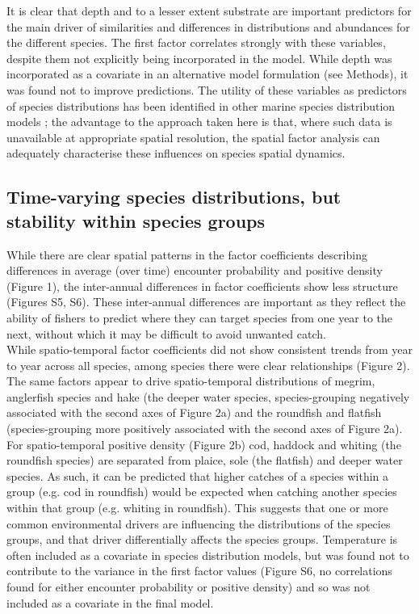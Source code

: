 \documentclass[fleqn,10pt]{wlscirep}
\begin{document}
\begin{linenumbers}
It is clear that depth and to a lesser extent substrate are important
predictors for the main driver of similarities and differences in distributions
and abundances for the different species. The first factor correlates
strongly with these variables, despite them not explicitly being incorporated
in the model. While depth was incorporated as a covariate in an alternative
model formulation (see Methods), it was found not to improve predictions. The
utility of these variables as predictors of species distributions has been
identified in other marine species distribution models \cite{Robinson2011}; the
advantage to the approach taken here is that, where such data is unavailable at
appropriate spatial resolution, the spatial factor analysis can adequately
characterise these influences on species spatial dynamics.\\

\subsection*{Time-varying species distributions, but stability within
		species groups\\} While there are clear spatial
patterns in the factor coefficients describing differences in average (over
time) encounter probability and positive density (Figure 1), the inter-annual
differences in factor coefficients show less structure (Figures S5, S6). These
inter-annual differences are important as they reflect the ability of fishers
to predict where they can target species from one year to the next, without
which it may be difficult to avoid unwanted catch.\\

While spatio-temporal factor coefficients did not show consistent trends from
year to year across all species, among species there were clear
relationships (Figure 2).  The same factors appear to drive spatio-temporal
distributions of megrim, anglerfish species and hake (the deeper water species,
species-grouping negatively associated with the second axes of Figure 2a) and
the roundfish and flatfish (species-grouping more positively associated with
the second axes of Figure 2a). For spatio-temporal positive density (Figure 2b)
cod, haddock and whiting (the roundfish species) are separated from plaice,
sole (the flatfish) and deeper water species. As such, it can be predicted that
higher catches of a species within a group (e.g. cod in roundfish) would be
expected when catching another species within that group (e.g. whiting in
roundfish). This suggests that one or more common environmental drivers are
influencing the distributions of the species groups, and that driver
differentially affects the species groups. Temperature is often included as a
covariate in species distribution models, but was found not to contribute to
the variance in the first factor values (Figure S6, no correlations found for
either encounter probability or positive density) and so was not included as a
covariate in the final model.\\


\end{linenumbers}
\end{document}
